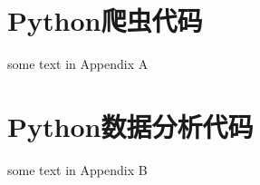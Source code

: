 \documentclass[UTF8,a4paper,10pt]{article}
\begin{document}
\begin{appendices}
    \section{Python爬虫代码}
    some text in Appendix A
    \section{Python数据分析代码}
    some text in Appendix B
 \end{appendices}

\clearpage
\end{document}
